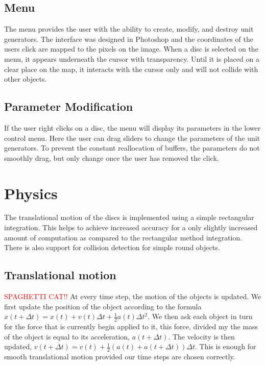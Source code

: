 \documentclass[pdftext,twoside,10pt]{article}
\newcommand{\spag}{\textcolor{red}{SPAGHETTI CAT!!}}
\begin{document}
\subsection{Menu}
The menu provides the user with the ability to create, modify, and destroy unit generators. The interface was designed in Photoshop and the coordinates of the users click are mapped to the pixels on the image. When a disc is selected on the menu, it appears underneath the cursor with transparency. Until it is placed on a clear place on the map, it interacts with the cursor only and will not collide with other objects.

\subsection{Parameter Modification}
If the user right clicks on a disc, the menu will display its parameters in the lower control menu. Here the user can drag sliders to change the parameters of the unit generators. To prevent the constant reallocation of buffers, the parameters do not smoothly drag, but only change once the user has removed the click.

\section{Physics}
The translational motion of the discs is implemented using a simple rectangular integration. This helps to achieve increased accuracy for a only slightly increased amount of computation as compared to the rectangular method integration. There is also support for collision detection for simple round objects.

\subsection{Translational motion}\spag
At every time step, the motion of the objects is updated. We first update the position of the object according to the formula $x(t + \Delta t) = x(t) + v(t)\Delta t + \frac{1}{2}a(t)\Delta t^2$. We then ask each object in turn for the force that is currently begin applied to it, this force, divided my the mass of the object is equal to its acceleration, $a(t+\Delta t)$. The velocity is then updated, $v(t + \Delta t) = v(t) + \frac{1}{2}(a(t) + a(t + \Delta t))\Delta t$. This is enough for smooth translational motion provided our time steps are chosen correctly.
\end{document}
